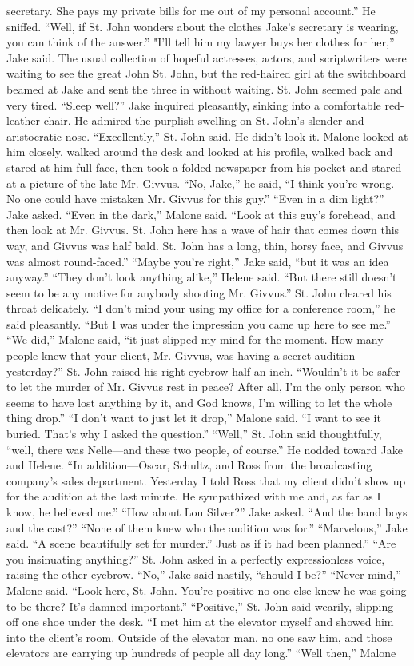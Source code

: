 \documentclass{novel}
\begin{document}
secretary. She pays my private bills for me out of my personal account.” He sniffed. “Well, if St. John wonders about the clothes Jake’s secretary is wearing, you can think of the answer.” "I'll tell him my lawyer buys her clothes for her,” Jake said. The usual collection of hopeful actresses, actors, and scriptwriters were waiting to see the great John St. John, but the red-haired girl at the switchboard beamed at Jake and sent the three in without waiting. St. John seemed pale and very tired. “Sleep well?” Jake inquired pleasantly, sinking into a comfortable red-leather chair. He admired the purplish swelling on St. John’s slender and aristocratic nose. “Excellently,” St. John said. He didn’t look it. Malone looked at him closely, walked around the desk and looked at his profile, walked back and stared at him full face, then took a folded newspaper from his pocket and stared at a picture of the late Mr. Givvus. “No, Jake,” he said, “I think you’re wrong. No one could have mistaken Mr. Givvus for this guy.” “Even in a dim light?” Jake asked. “Even in the dark,” Malone said. “Look at this guy’s forehead, and then look at Mr. Givvus. St. John here has a wave of hair that comes down this way, and Givvus was half bald. St. John has a long, thin, horsy face, and Givvus was almost round-faced.” “Maybe you’re right,” Jake said, “but it was an idea anyway.” “They don’t look anything alike,” Helene said. “But there still doesn’t seem to be any motive for anybody shooting Mr. Givvus.” St. John cleared his throat delicately. “I don’t mind your using my office for a conference room,” he said pleasantly. “But I was under the impression you came up here to see me.” “We did,” Malone said, “it just slipped my mind for the moment. How many people knew that your client, Mr. Givvus, was having a secret audition yesterday?” St. John raised his right eyebrow half an inch. “Wouldn’t it be safer to let the murder of Mr. Givvus rest in peace? After all, I’m the only person who seems to have lost anything by it, and God knows, I’m willing to let the whole thing drop.” “I don’t want to just let it drop,” Malone said. “I want to see it buried. That’s why I asked the question.” “Well,” St. John said thoughtfully, “well, there was Nelle—and these two people, of course.” He nodded toward Jake and Helene. “In addition—Oscar, Schultz, and Ross from the broadcasting company’s sales department. Yesterday I told Ross that my client didn’t show up for the audition at the last minute. He sympathized with me and, as far as I know, he believed me.” “How about Lou Silver?” Jake asked. “And the band boys and the cast?” “None of them knew who the audition was for.” “Marvelous,” Jake said. “A scene beautifully set for murder.” Just as if it had been planned.” “Are you insinuating anything?” St. John asked in a perfectly expressionless voice, raising the other eyebrow. “No,” Jake said nastily, “should I be?” “Never mind,” Malone said. “Look here, St. John. You’re positive no one else knew he was going to be there? It’s damned important.” “Positive,” St. John said wearily, slipping off one shoe under the desk. “I met him at the elevator myself and showed him into the client’s room. Outside of the elevator man, no one saw him, and those elevators are carrying up hundreds of people all day long.” “Well then,” Malone 
\end{document}
